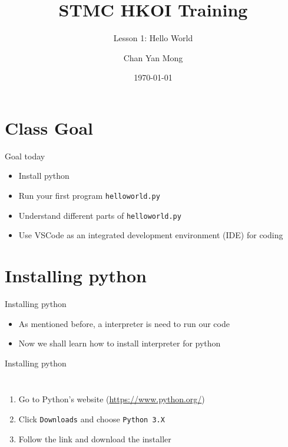 \documentclass[10pt,xcolor={table,dvipsnames},t]{beamer}
\title[Your Short Title]{STMC HKOI Training}
\subtitle{Lesson 1: Hello World}
\author{Chan Yan Mong}
\date{\today}
\begin{document}
\begin{frame}
  \titlepage
\end{frame}


\section{Class Goal}

\begin{frame}{Goal today}

\begin{itemize}
  \item Install python
  \item Run your first program \texttt{helloworld.py}
  \item Understand different parts of \texttt{helloworld.py}
  \item Use VSCode as an integrated development environment (IDE) for coding
\end{itemize}

\end{frame}

\section{Installing python}

\begin{frame}{Installing python}
  \begin{itemize}
    \item As mentioned before, a interpreter is need to run our code
    \item Now we shall learn how to install interpreter for python
  \end{itemize}
\end{frame}


\begin{frame}{Installing python}
  \begin{columns}
    \begin{enumerate}[Step 1:]
      \item Go to Python's website (\href{https://www.python.org/}{https://www.python.org/})
      \item Click \texttt{Downloads} and choose \texttt{Python 3.X}
      \item Follow the link and download the installer
    \end{enumerate}
  \end{columns}
  
\end{frame}
\end{document}
